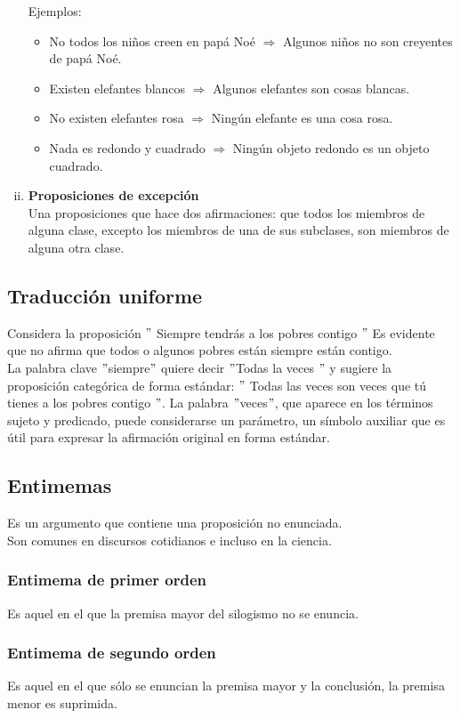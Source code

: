 \documentclass[10pt]{book} 						%
\begin{document}
\begin{enumerate}[i)]
Ejemplos:
\begin{itemize}
\item No todos los niños creen en papá Noé $\Rightarrow$ Algunos niños no son creyentes de papá Noé.
\item Existen elefantes blancos $\Rightarrow$ Algunos elefantes son cosas blancas.
\item No existen elefantes rosa $\Rightarrow$ Ningún elefante es una cosa rosa.
\item Nada es redondo y cuadrado $\Rightarrow$ Ningún objeto redondo es un objeto cuadrado.
\end{itemize}
\item \textbf{Proposiciones de excepción}\\
Una proposiciones que hace dos afirmaciones: que todos los miembros de alguna clase, excepto los miembros de una de sus subclases, son miembros de alguna otra clase.
\end{enumerate}
\subsection{Traducción uniforme}
Considera la proposición $"$ Siempre tendrás a los pobres contigo $"$ Es evidente que no afirma que todos o algunos  pobres están siempre están contigo.\\
La palabra clave $"$siempre$"$ quiere decir $"$Todas la veces $"$ y sugiere la proposición categórica de forma estándar: $"$ Todas las veces son veces que tú tienes a los pobres contigo $"$. La palabra $"$veces$"$, que aparece en los términos sujeto y predicado, puede considerarse un parámetro, un símbolo auxiliar que es útil para expresar la afirmación original en forma estándar.
\subsection{Entimemas}
Es un argumento que contiene una proposición no enunciada.\\
Son comunes en discursos cotidianos e incluso en la ciencia.
\subsubsection{Entimema de primer orden}
Es aquel en el que la premisa mayor del silogismo no se enuncia.
\subsubsection{Entimema de segundo orden}
Es aquel en el que sólo se enuncian la premisa mayor y la conclusión, la premisa menor es suprimida.
\end{document}
